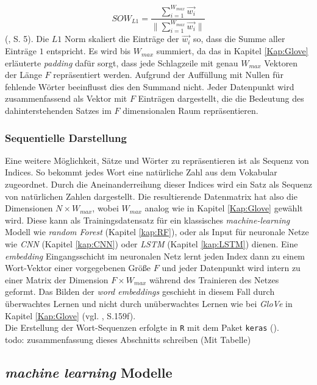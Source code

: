\documentclass[a4paper,11pt]{article}
\begin{document}
\[SOW_{L1} = \frac{\sum_{i=1}^{W_{max}} \Vec{w_i}}{\| \sum_{i=1}^{W_{max}}  \vec{w_i} \|} \]
(\cite{sumsWords}, S. 5). Die $L1$ Norm skaliert die Einträge der $\Vec{w_i}$ so, dass die Summe aller Einträge $1$ entspricht. Es wird bis $W_{max}$ summiert, da das in Kapitel \ref{Kap:Glove} erläuterte \textit{padding} dafür sorgt, dass jede Schlagzeile mit genau $W_{max}$ Vektoren der Länge $F$ repräsentiert werden. Aufgrund der Auffüllung mit Nullen für fehlende Wörter beeinflusst dies den Summand nicht.
Jeder Datenpunkt wird zusammenfassend als Vektor mit $F$ Einträgen dargestellt, die die Bedeutung des dahinterstehenden Satzes im $F$ dimensionalen Raum repräsentieren.


\subsubsection{Sequentielle Darstellung} \label{Kap:Seq}

Eine weitere Möglichkeit, Sätze und Wörter zu repräsentieren ist als Sequenz von Indices. So bekommt jedes Wort eine natürliche Zahl aus dem Vokabular zugeordnet. Durch die Aneinanderreihung dieser Indices wird ein Satz als Sequenz von natürlichen Zahlen dargestellt. Die resultierende Datenmatrix hat also die Dimensionen $N \times W_{max}$, wobei $W_{max}$ analog wie in Kapitel \ref{Kap:Glove} gewählt wird. Diese kann als Trainingsdatensatz für ein klassisches \textit{machine-learning} Modell wie \textit{random Forest} (Kapitel \ref{kap:RF}), oder als Input für neuronale Netze wie \textit{CNN} (Kapitel \ref{kap:CNN}) oder \textit{LSTM} (Kapitel \ref{kap:LSTM}) dienen. Eine \textit{embedding} Eingangsschicht im neuronalen Netz lernt jeden Index dann zu einem Wort-Vektor einer vorgegebenen Größe $F$ und jeder Datenpunkt wird intern zu einer Matrix der Dimension $F \times W_{max}$ während des Trainieren des Netzes geformt. Das Bilden der \textit{word embeddings} geschieht in diesem Fall durch überwachtes Lernen und nicht durch unüberwachtes Lernen wie bei \textit{GloVe} in Kapitel \ref{Kap:Glove} (vgl. \cite{keras}, S.159f).\\
Die Erstellung der Wort-Sequenzen erfolgte in \texttt{R} mit dem Paket \texttt{keras} (\cite{kerasR}).\\

todo: zusammenfassung dieses Abschnitts schreiben (Mit Tabelle)


\subsection{\textit{machine learning} Modelle}
\end{document}
